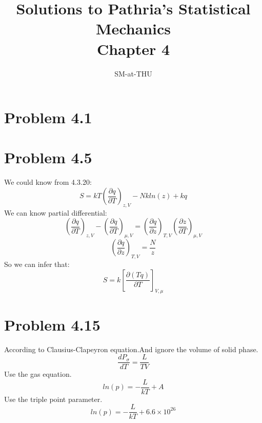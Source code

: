 \documentclass{article}
\author{SM-at-THU}
\title{\bf{Solutions to Pathria's Statistical Mechanics}\\Chapter 4}
\begin{document}
\maketitle
\section*{Problem 4.1}

\section*{Problem 4.5} %
\label{sec:problem_4_5}
	
	We could know from 4.3.20:
	$$S=kT(\frac{\partial q}{\partial T})_{z,V}-Nkln(z)+kq$$
	We can know partial differential:
	$$(\frac{\partial q}{\partial T})_{z,V}-(\frac{\partial q}{\partial T})_{\mu,V}=(\frac{\partial q}{\partial z})_{T,V}(\frac{\partial z}{\partial T})_{\mu,V}$$
	$$(\frac{\partial q}{\partial z})_{T,V}=\frac{N}{z}$$
	So we can infer that:
	$$S=k[\frac{\partial (Tq)}{\partial{T}}]_{V,\mu}$$

\section*{Problem 4.15} %
\label{sec:problem_4_15}
	

	According to Clausius-Clapeyron equation.And ignore the volume of solid phase.
	$$\frac{dP_{\sigma}}{dT}=\frac{L}{TV}$$
	Use the gas equation.
	$$ln(p)=-\frac{L}{kT}+A$$
	Use the triple point parameter.
	$$ln(p)=-\frac{L}{kT}+6.6\times10^{26}$$
\end{document}
